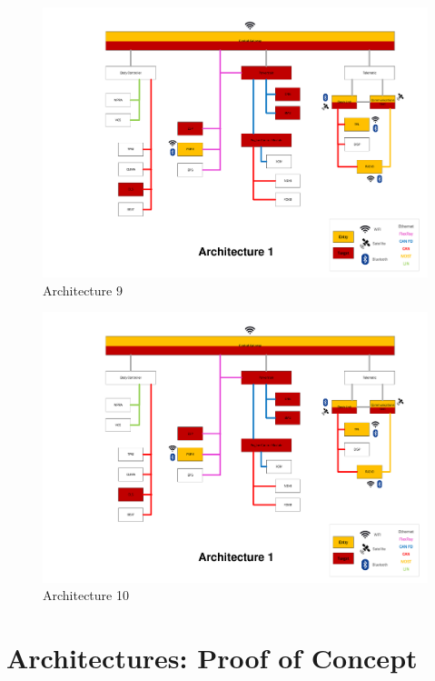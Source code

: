 \begin{figure}[h]
    \centering
    \includegraphics[width=\textwidth, page=9]{../Architectures-survey.pdf}
    \caption{Architecture 9}
    \label{fig:architecture9}
\end{figure}

\begin{figure}[h]
    \centering
    \includegraphics[width=\textwidth, page=10]{../Architectures-survey.pdf}
    \caption{Architecture 10}
    \label{fig:architecture10}
\end{figure}


\chapter{Architectures: Proof of Concept}
\label{fig:pocarch}


